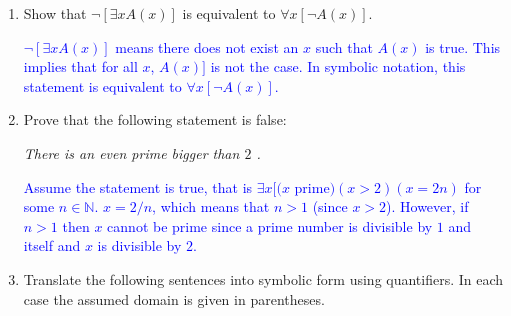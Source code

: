 \documentclass[13.5pt]{article}
\begin{document}
\begin{enumerate}

\item{Show that \(\neg[\exists x A(x)]\) is equivalent to \(\forall x [\neg A(x)]\).}


\textcolor{blue} {\(\neg[\exists x A(x)]\) means there does not exist an \(x\) such that \(A(x)\) is true. This implies that for all \(x\), \(A(x)]\) is not the case. In symbolic notation, this statement is equivalent to \(\forall x [\neg A(x)]\).}


\item{ Prove that the following statement is false:}

\begin{center}
\textit{There is an even prime bigger than \(2\) .}
\end{center}

\textcolor{blue} {Assume the statement is true, that is \(\exists x[(x\) prime\()(x>2)(x=2n)\) for some \(n\in\mathbb{N}\). \(x=2/n\), which means that \(n>1\) (since \(x>2\)). However, if \(n>1\) then \(x\) cannot be prime since a prime number is divisible by \(1\) and itself and \(x\) is divisible by \(2\).}

\item{Translate the following sentences into symbolic form using quantifiers. In each case the assumed domain is given in parentheses.}
\begin{enumerate}
\setlength{\itemindent}{.1in}


\end{enumerate}
\end{enumerate}
\end{document}

